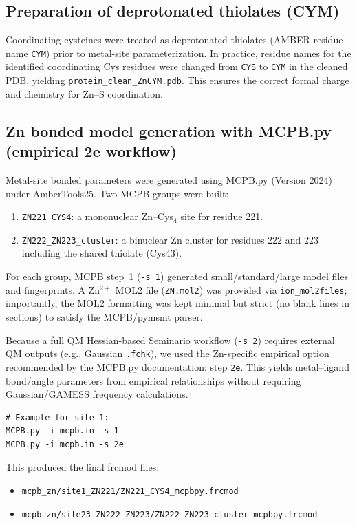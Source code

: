 \subsection{Preparation of deprotonated thiolates (CYM)}
Coordinating cysteines were treated as deprotonated thiolates (AMBER residue name \texttt{CYM}) prior to metal-site parameterization. In practice, residue names for the identified coordinating Cys residues were changed from \texttt{CYS} to \texttt{CYM} in the cleaned PDB, yielding \texttt{protein\_clean\_ZnCYM.pdb}. This ensures the correct formal charge and chemistry for Zn--S coordination.

\subsection{Zn bonded model generation with MCPB.py (empirical 2e workflow)}
Metal-site bonded parameters were generated using MCPB.py (Version 2024) under AmberTools25. Two MCPB groups were built:
\begin{enumerate}
  \item \texttt{ZN221\_CYS4}: a mononuclear Zn--Cys$_4$ site for residue 221.
  \item \texttt{ZN222\_ZN223\_cluster}: a binuclear Zn cluster for residues 222 and 223 including the shared thiolate (Cys43).
\end{enumerate}
For each group, MCPB step~1 (\texttt{-s 1}) generated small/standard/large model files and fingerprints. A Zn$^{2+}$ MOL2 file (\texttt{ZN.mol2}) was provided via \texttt{ion\_mol2files}; importantly, the MOL2 formatting was kept minimal but strict (no blank lines in sections) to satisfy the MCPB/pymsmt parser.

Because a full QM Hessian-based Seminario workflow (\texttt{-s 2}) requires external QM outputs (e.g., Gaussian \texttt{.fchk}), we used the Zn-specific empirical option recommended by the MCPB.py documentation: step \texttt{2e}. This yields metal--ligand bond/angle parameters from empirical relationships without requiring Gaussian/GAMESS frequency calculations.
\begin{verbatim}
# Example for site 1:
MCPB.py -i mcpb.in -s 1
MCPB.py -i mcpb.in -s 2e
\end{verbatim}
This produced the final frcmod files:
\begin{itemize}
  \item \texttt{mcpb\_zn/site1\_ZN221/ZN221\_CYS4\_mcpbpy.frcmod}
  \item \texttt{mcpb\_zn/site23\_ZN222\_ZN223/ZN222\_ZN223\_cluster\_mcpbpy.frcmod}
\end{itemize}

